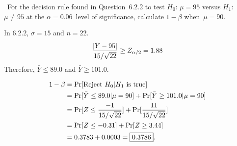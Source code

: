 \begin{problem}
  ~For the decision rule found in Question~6.2.2 to test $H_0$: ${\mu = 95}$ versus $H_1$: ${\mu \ne 95}$ at the ${\alpha = 0.06}$~level of significance, calculate ${1 - \beta}$ when~${\mu = 90}$.
\end{problem}

In 6.2.2, ${\sigma = 15}$ and ${n =22}$.
\begin{equation}
  \frac{\lvert\bar{Y} - 95\rvert}{15 / \sqrt{22}} \geq Z_{\alpha/2} = 1.88
\end{equation}
\noindent
Therefore, ${\bar{Y} \leq 89.0}$ and ${\bar{Y} \geq 101.0}$.

\noindent
\begin{align*}
  1 - \beta &= \Pr\lbrack\text{Reject } H_0 \vert H_1 \text{ is true}\rbrack \\
            &= \Pr\lbrack\bar{Y} \leq 89.0 \vert \mu = 90\rbrack + \Pr\lbrack\bar{Y} \geq 101.0 \vert \mu = 90\rbrack \\
            &= \Pr\lbrack Z \leq \frac{-1}{15 / \sqrt{22}}\rbrack + \Pr\lbrack\frac{11}{15 / \sqrt{22}}\rbrack \\
            &= \Pr\lbrack Z \leq -0.31\rbrack + \Pr\lbrack Z \geq 3.44\rbrack \\
            &= 0.3783 + 0.0003 = \boxed{0.3786}\text{.}
\end{align*}

